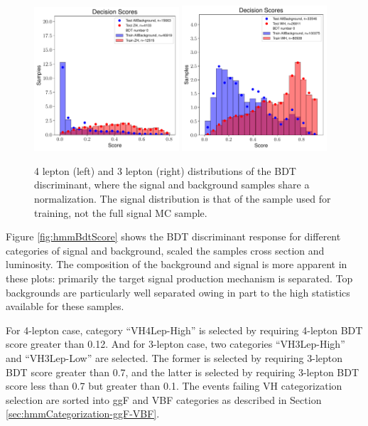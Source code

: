 \begin{figure}[htpb]
  \centering
  \includegraphics[width=0.48\textwidth]{figures/hmm/bdtHist/bar20-4lep-ZH-AllBackground-0-depth2-nEst80tag-new-AllBackground.pdf}
  \includegraphics[width=0.48\textwidth]{figures/hmm/bdtHist/bar20-3lep-WH-AllBackground-0-depth2-nEst50tag-new-AllBackground.pdf}
  \caption{4 lepton (left) and 3 lepton (right) distributions of the BDT discriminant, where the signal and background samples share a normalization. The signal distribution is that of the sample used for training, not the full signal MC sample.}
    \label{fig:hmmBdtScoreLin}
\end{figure}

Figure \ref{fig:hmmBdtScore} shows the BDT discriminant response for different categories of signal and background, scaled the samples cross section and luminosity. The composition of the background and signal is more apparent in these plots: primarily the target signal production mechanism is separated. Top backgrounds are particularly well separated owing in part to the high statistics available for these samples.

For 4-lepton case, category ``VH4Lep-High'' is selected by requiring 4-lepton BDT 
score greater than 0.12. 
And for 3-lepton case, two categories ``VH3Lep-High'' and ``VH3Lep-Low'' are selected. The former
is selected by requiring 3-lepton BDT score greater than 0.7,
and the latter is selected by requiring 3-lepton BDT score less than 0.7
but greater than 0.1.
The events failing VH categorization selection are sorted into ggF and
VBF categories as described in Section \ref{sec:hmmCategorization-ggF-VBF}.
 

